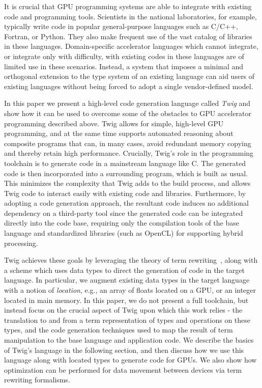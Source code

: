 
It is crucial that GPU programming systems are able to integrate with
existing code and programming tools. Scientists in the national
laboratories, for example, typically write code in popular
general-purpose languages such as C/C++, Fortran, or Python. They also
make frequent use of the vast catalog of libraries in these
languages. Domain-specific accelerator languages which cannot
integrate, or integrate only with difficulty, with existing codes in
these languages are of limited use in these scenarios.  Instead, a
system that imposes a minimal and orthogonal extension to the type
system of an existing language can aid users of existing languages
without being forced to adopt a single vendor-defined model.

In this paper we present a high-level code generation language called
\emph{Twig} and show how it can be used to overcome some of the
obstacles to GPU accelerator programming described above. Twig allows
for simple, high-level GPU programming, and at the same time supports
automated reasoning about composite programs that can, in many cases,
avoid redundant memory copying and thereby retain high
performance. Crucially, Twig's role in the programming toolchain is to
generate code in a mainstream language like C. The generated code is
then incorporated into a surrounding program, which is built as
usual. This minimizes the complexity that Twig adds to the build
process, and allows Twig code to interact easily with existing code
and libraries.  Furthermore, by adopting a code generation approach,
the resultant code induces no additional dependency on a third-party
tool since the generated code can be integrated directly into the code
base, requiring only the compilation tools of the base language and
standardized libraries (such as OpenCL) for supporting hybrid
processing.

Twig achieves these goals by leveraging the theory of term
rewriting~\cite{baader98rewriting}, along with a scheme which uses
data types to direct the generation of code in the target language. In
particular, we augment existing data types in the target language with
a notion of \emph{location}, e.g., an array of floats located on a
GPU, or an integer located in main memory.  In this paper, we do not
present a full toolchain, but instead focus on the crucial aspect of
Twig upon which this work relies - the translation to and from a term
representation of types and operations on these types, and the code
generation techniques used to map the result of term manipulation to
the base language and application code.  We describe the basics of
Twig's language in the following section, and then discuss how we use
this language along with located types to generate code for GPUs.  We
also show how optimization can be performed for data movement between 
devices via term rewriting formalisms.

